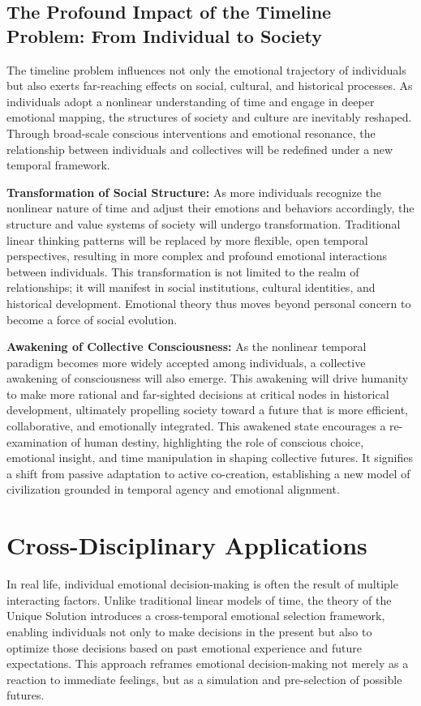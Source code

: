 \documentclass[12pt]{article}
\begin{document}
\subsection{The Profound Impact of the Timeline Problem: From Individual to Society}

The timeline problem influences not only the emotional trajectory of individuals but also exerts far-reaching effects on social, cultural, and historical processes. As individuals adopt a nonlinear understanding of time and engage in deeper emotional mapping, the structures of society and culture are inevitably reshaped. Through broad-scale conscious interventions and emotional resonance, the relationship between individuals and collectives will be redefined under a new temporal framework.

\textbf{Transformation of Social Structure:} As more individuals recognize the nonlinear nature of time and adjust their emotions and behaviors accordingly, the structure and value systems of society will undergo transformation. Traditional linear thinking patterns will be replaced by more flexible, open temporal perspectives, resulting in more complex and profound emotional interactions between individuals. This transformation is not limited to the realm of relationships; it will manifest in social institutions, cultural identities, and historical development. Emotional theory thus moves beyond personal concern to become a force of social evolution.

\textbf{Awakening of Collective Consciousness:} As the nonlinear temporal paradigm becomes more widely accepted among individuals, a collective awakening of consciousness will also emerge. This awakening will drive humanity to make more rational and far-sighted decisions at critical nodes in historical development, ultimately propelling society toward a future that is more efficient, collaborative, and emotionally integrated. This awakened state encourages a re-examination of human destiny, highlighting the role of conscious choice, emotional insight, and time manipulation in shaping collective futures. It signifies a shift from passive adaptation to active co-creation, establishing a new model of civilization grounded in temporal agency and emotional alignment.
\section{Cross-Disciplinary Applications}

In real life, individual emotional decision-making is often the result of multiple interacting factors. Unlike traditional linear models of time, the theory of the Unique Solution introduces a cross-temporal emotional selection framework, enabling individuals not only to make decisions in the present but also to optimize those decisions based on past emotional experience and future expectations. This approach reframes emotional decision-making not merely as a reaction to immediate feelings, but as a simulation and pre-selection of possible futures.
\end{document}
